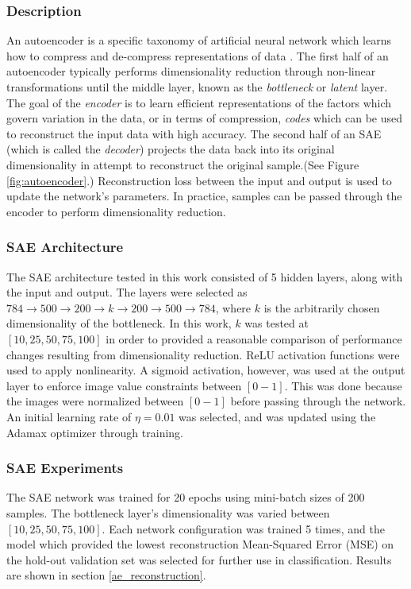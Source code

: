 \documentclass[conference]{IEEEtran}
\begin{document}
	 \subsubsection*{Description}
	 An autoencoder is a specific taxonomy of artificial neural network which learns how to  compress and de-compress representations of data \cite{Haykin2009NeuralNetworks,Goodfellow2016DeepLearning}. The first half of an autoencoder typically performs dimensionality reduction through non-linear transformations until the middle layer, known as the \textit{bottleneck} or \textit{latent} layer.  The goal of the \textit{encoder} is to learn efficient representations of the factors which govern variation in the data, or in terms of compression, \textit{codes} which can be used to reconstruct the input  data with high accuracy. The second half of an SAE (which is called the \textit{decoder}) projects the data back into its original dimensionality in attempt to reconstruct the original sample.(See Figure \ref{fig:autoencoder}.) Reconstruction loss between the input and output is used to update the network's parameters.  In practice, samples can be passed through the encoder to perform dimensionality reduction. 
	 
  	\subsubsection*{SAE Architecture}
  	The SAE architecture tested in this work consisted of 5 hidden layers, along with the input and output.  The layers were selected as $784 \rightarrow 500 \rightarrow 200 \rightarrow k \rightarrow 200 \rightarrow 500 \rightarrow 784$, where $k$ is the arbitrarily chosen dimensionality of the bottleneck.  In this work, $k$ was tested at $[10,25,50,75,100]$ in order to provided a reasonable comparison of performance changes resulting from dimensionality reduction.  ReLU activation functions were used to apply nonlinearity.  A sigmoid activation, however, was used at the output layer to enforce image value constraints between $[0-1]$.  This was done because the images were normalized between $[0-1]$ before passing through the network.  An initial learning rate of $\eta=0.01$ was selected, and was updated using the Adamax optimizer through training.
  	
  	\subsubsection*{SAE Experiments}
  	The SAE network was trained for 20 epochs using mini-batch sizes of 200 samples.  The bottleneck layer's dimensionality was varied between $[10,25,50,75,100]$.  Each network configuration was trained 5 times, and the model which provided the lowest reconstruction  Mean-Squared Error (MSE) on the hold-out validation set was selected for further use in classification.  Results are shown in section \ref{ae_reconstruction}.
  	
\end{document}
